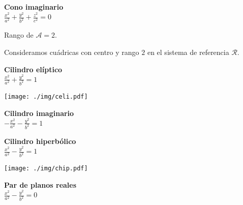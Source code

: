 \begin{minipage}[c]{0.45\textwidth}
  {\bf Cono imaginario}\vspace{1em}\\
  $\displaystyle \frac{{x}^2}{a^2} + \frac{{y}^2}{b^2}+\frac{{z}^2}{c^2}=0$
\end{minipage}\hfill
\begin{minipage}[]{0.45\textwidth}
\hfill
\end{minipage}

\vspace{1em}

Rango de $\mathcal A = 2$.

Consideramos cuádricas con centro y rango $2$ en el sistema de referencia $\mathcal R$.

\vspace{1em}

\begin{minipage}[c]{0.45\textwidth}
  {\bf Cilindro elíptico}\vspace{1em}\\
  $\displaystyle \frac{{x}^2}{a^2} + \frac{{y}^2}{b^2}=1$
\end{minipage}\hfill
\begin{minipage}[]{0.45\textwidth}
\texttt{[image: ./img/celi.pdf]}
\end{minipage}

\begin{minipage}[c]{0.45\textwidth}
  {\bf Cilindro imaginario}\vspace{1em}\\
  $\displaystyle -\frac{{x}^2}{a^2} - \frac{{y}^2}{b^2}=1$
\end{minipage}\hfill
\begin{minipage}[]{0.45\textwidth}
\hfill
\end{minipage}

\begin{minipage}[c]{0.45\textwidth}
  {\bf Cilindro hiperbólico}\vspace{1em}\\
  $\displaystyle \frac{{x}^2}{a^2} - \frac{{y}^2}{b^2}=1$
\end{minipage}\hfill
\begin{minipage}[]{0.45\textwidth}
\texttt{[image: ./img/chip.pdf]}
\end{minipage}

\begin{minipage}[c]{0.45\textwidth}
  {\bf Par de planos reales}\vspace{1em}\\
  $\displaystyle \frac{{x}^2}{a^2} - \frac{{y}^2}{b^2}=0$
\end{minipage}\hfill\vspace{1em}
\begin{minipage}[]{0.45\textwidth}
\hfill
\end{minipage}

